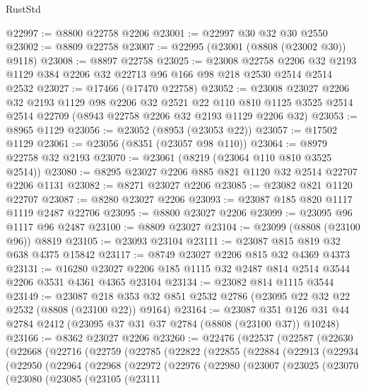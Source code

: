 \begin{lexlean}{RustStd}
\begin{coremodule}
@22997 := @8800 @22758 @2206
@23001 := @22997 @30 @32 @30 @2550
@23002 := @8809 @22758
@23007 := @22995 (@23001 (@8808 (@23002 @30)) @9118)
@23008 := @8897 @22758
@23025 := @23008
    @22758
    @2206
    @32
    @2193
    @1129
    @384
    @2206
    @32
    @22713
    @96
    @166
    @98
    @218
    @2530
    @2514
    @2514
    @2532
@23027 := @17466 (@17470 @22758)
@23052 := @23008
    @23027
    @2206
    @32
    @2193
    @1129
    @98
    @2206
    @32
    @2521
    @22
    @110
    @810
    @1125
    @3525
    @2514
    @2514
    @22709
    (@8943 @22758 @2206 @32 @2193 @1129 @2206 @32)
@23053 := @8965 @1129
@23056 := @23052 (@8953 (@23053 @22))
@23057 := @17502 @1129
@23061 := @23056 (@8351 (@23057 @98 @110))
@23064 := @8979 @22758 @32 @2193
@23070 := @23061 (@8219 (@23064 @110 @810 @3525 @2514))
@23080 := @8295 @23027 @2206 @885 @821 @1120 @32 @2514 @22707 @2206 @1131
@23082 := @8271 @23027 @2206
@23085 := @23082 @821 @1120 @22707
@23087 := @8280 @23027 @2206
@23093 := @23087 @185 @820 @1117 @1119 @2487 @22706
@23095 := @8800 @23027 @2206
@23099 := @23095 @96 @1117 @96 @2487
@23100 := @8809 @23027
@23104 := @23099 (@8808 (@23100 @96)) @8819
@23105 := @23093 @23104
@23111 := @23087 @815 @819 @32 @638 @4375 @15842
@23117 := @8749 @23027 @2206 @815 @32 @4369 @4373
@23131 := @16280 @23027 @2206 @185 @1115 @32 @2487 @814 @2514 @3544 @2206 @3531 @4361 @4365 @23104
@23134 := @23082 @814 @1115 @3544
@23149 := @23087
    @218
    @353
    @32
    @851
    @2532
    @2786
    (@23095 @22 @32 @22 @2532 (@8808 (@23100 @22)) @9164)
@23164 := @23087
    @351
    @126
    @31
    @44
    @2784
    @2412
    (@23095 @37 @31 @37 @2784 (@8808 (@23100 @37)) @10248)
@23166 := @8362 @23027 @2206
@23260 := @22476
    (@22537
      (@22587
        (@22630
          (@22668
            (@22716
              (@22759
                (@22785
                  (@22822
                    (@22855
                      (@22884
                        (@22913
                          (@22934
                            (@22950
                              (@22964
                                (@22968
                                  (@22972
                                    (@22976
                                      (@22980
                                        (@23007
                                          (@23025
                                            (@23070
                                              (@23080
                                                (@23085
                                                  (@23105
                                                    (@23111

\end{coremodule}
\end{lexlean}
